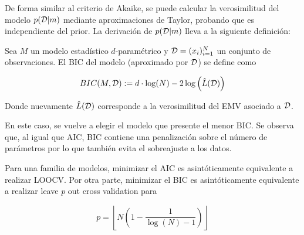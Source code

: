De forma similar al criterio de Akaike, se puede calcular la verosimilitud del modelo $p({\mathcal D}|m)$ mediante aproximaciones de Taylor, probando que es independiente del prior. La derivación de $p({\mathcal D}|m)$ lleva a la siguiente definición:

\begin{definition}[BIC]
	Sea $M$ un modelo estadístico $d$-paramétrico y ${\mathcal D}=(x_i)_{i=1}^N$ un conjunto de observaciones. El BIC del modelo (aproximado por ${\mathcal D}$) se define como
	
	\begin{equation}
		BIC(M,{\mathcal D}):= d\cdot\log(N) - 2\log\left(\hat{L}({\mathcal D})\right)
	\end{equation}
	
	Donde nuevamente $\hat{L}({\mathcal D})$ corresponde a la verosimilitud del EMV asociado a ${\mathcal D}$.
\end{definition}

En este caso, se vuelve a elegir el modelo que presente el menor BIC. Se observa que, al igual que AIC, BIC contiene una penalización sobre el número de parámetros por lo que también evita el sobreajuste a los datos.

\begin{remark} Para una familia de modelos, minimizar el AIC es asintóticamente equivalente a realizar LOOCV. Por otra parte, minimizar el BIC es asintóticamente equivalente a realizar leave $p$ out cross validation para

\begin{equation}
	p=\left\lfloor N\left(1-\frac{1}{\log(N)-1}\right)\right\rfloor
\end{equation}
	
\end{remark}

